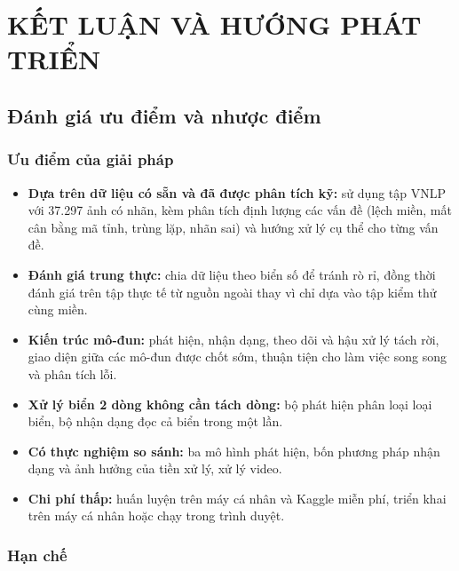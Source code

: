 \chapter{KẾT LUẬN VÀ HƯỚNG PHÁT TRIỂN}

\section{Đánh giá ưu điểm và nhược điểm}

\subsection{Ưu điểm của giải pháp}

\begin{itemize}
  \item \textbf{Dựa trên dữ liệu có sẵn và đã được phân tích kỹ:} sử dụng tập VNLP với 37.297 ảnh có nhãn, kèm phân tích định lượng các vấn đề (lệch miền, mất cân bằng mã tỉnh, trùng lặp, nhãn sai) và hướng xử lý cụ thể cho từng vấn đề.
  \item \textbf{Đánh giá trung thực:} chia dữ liệu theo biển số để tránh rò rỉ, đồng thời đánh giá trên tập thực tế từ nguồn ngoài thay vì chỉ dựa vào tập kiểm thử cùng miền.
  \item \textbf{Kiến trúc mô-đun:} phát hiện, nhận dạng, theo dõi và hậu xử lý tách rời, giao diện giữa các mô-đun được chốt sớm, thuận tiện cho làm việc song song và phân tích lỗi.
  \item \textbf{Xử lý biển 2 dòng không cần tách dòng:} bộ phát hiện phân loại loại biển, bộ nhận dạng đọc cả biển trong một lần.
  \item \textbf{Có thực nghiệm so sánh:} ba mô hình phát hiện, bốn phương pháp nhận dạng và ảnh hưởng của tiền xử lý, xử lý video.
  \item \textbf{Chi phí thấp:} huấn luyện trên máy cá nhân và Kaggle miễn phí, triển khai trên máy cá nhân hoặc chạy trong trình duyệt.
\end{itemize}

\subsection{Hạn chế}

